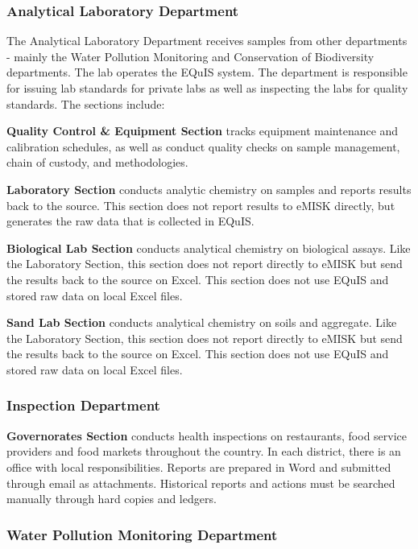 \subsubsection{Analytical Laboratory Department}

The Analytical Laboratory Department receives samples from other departments - mainly the Water Pollution Monitoring and Conservation of Biodiversity departments. The lab operates the EQuIS system. The department is responsible for issuing lab standards for private labs as well as inspecting the labs for quality standards. The sections include:

\textbf{Quality Control \& Equipment Section} tracks equipment maintenance and calibration schedules, as well as conduct quality checks on sample management, chain of custody, and methodologies.

\textbf{Laboratory Section} conducts analytic chemistry on samples and reports results back to the source. This section does not report results to eMISK directly, but generates the raw data that is collected in EQuIS.

\textbf{Biological Lab Section} conducts analytical chemistry on biological assays. Like the Laboratory Section, this section does not report directly to eMISK but send the results back to the source on Excel. This section does not use EQuIS and stored raw data on local Excel files.

\textbf{ Sand Lab Section} conducts analytical chemistry on soils and aggregate. Like the Laboratory Section, this section does not report directly to eMISK but send the results back to the source on Excel. This section does not use EQuIS and stored raw data on local Excel files.

\subsubsection{Inspection Department}

\textbf{Governorates Section} conducts health inspections on restaurants, food service providers and food markets throughout the country. In each district, there is an office with local responsibilities. Reports are prepared in Word and submitted through email as attachments. Historical reports and actions must be searched manually through hard copies and ledgers.

\subsubsection{Water Pollution Monitoring Department}

